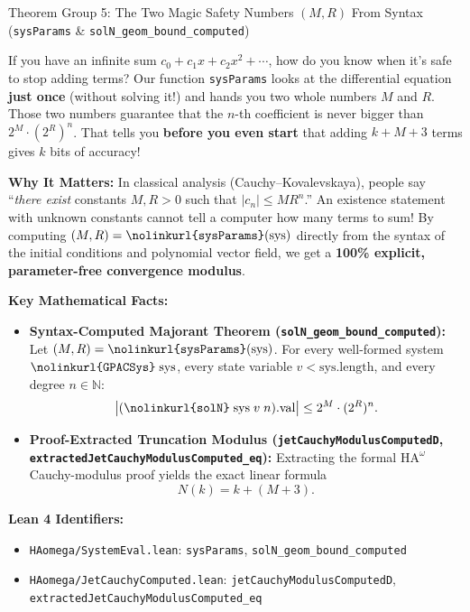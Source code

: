 \documentclass[11pt,a4paper]{article}
\newcommand{\HAomega}{\ensuremath{\mathrm{HA}^{\omega}}}
\newcommand{\N}{\ensuremath{\mathbb{N}}}
\newcommand{\lean}[1]{\texttt{\nolinkurl{#1}}}
\begin{document}
\vspace{6pt}

\begin{thmcard}{Theorem Group 5: The Two Magic Safety Numbers \texorpdfstring{$(M, R)$}{(M, R)} From Syntax (\lean{sysParams} \& \lean{solN\_geom\_bound\_computed})}
\begin{eli5box}
If you have an infinite sum $c_0 + c_1 x + c_2 x^2 + \cdots$, how do you know when it's safe to stop adding terms? Our function \lean{sysParams} looks at the differential equation \textbf{just once} (without solving it!) and hands you two whole numbers $M$ and $R$. Those two numbers guarantee that the $n$-th coefficient is never bigger than $2^M \cdot (2^R)^n$. That tells you \textbf{before you even start} that adding $k + M + 3$ terms gives $k$ bits of accuracy!
\end{eli5box}

\textbf{Why It Matters:}
In classical analysis (Cauchy--Kovalevskaya), people say ``\emph{there exist} constants $M, R > 0$ such that $|c_n| \le M R^n$.'' An existence statement with unknown constants cannot tell a computer how many terms to sum! By computing $(M, R) = \lean{sysParams}(\mathrm{sys})$ directly from the syntax of the initial conditions and polynomial vector field, we get a \textbf{100\% explicit, parameter-free convergence modulus}.

\textbf{Key Mathematical Facts:}
\begin{itemize}
  \item \textbf{Syntax-Computed Majorant Theorem (\lean{solN_geom_bound_computed}):} Let $(M, R) = \lean{sysParams}(\mathrm{sys})$. For every well-formed system $\lean{GPACSys}\;\mathrm{sys}$, every state variable $v < \mathrm{sys.length}$, and every degree $n \in \N$:
  \[
    \bigl|(\lean{solN}\;\mathrm{sys}\;v\;n).\mathrm{val}\bigr| \le 2^M \cdot (2^R)^n.
  \]
  \item \textbf{Proof-Extracted Truncation Modulus (\lean{jetCauchyModulusComputedD}, \lean{extractedJetCauchyModulusComputed_eq}):} Extracting the formal $\HAomega$ Cauchy-modulus proof yields the exact linear formula
  \[
    N(k) = k + (M + 3).
  \]
\end{itemize}

\textbf{Lean 4 Identifiers:}
\begin{itemize}
  \item \lean{HAomega/SystemEval.lean}: \lean{sysParams}, \lean{solN_geom_bound_computed}
  \item \lean{HAomega/JetCauchyComputed.lean}: \lean{jetCauchyModulusComputedD}, \lean{extractedJetCauchyModulusComputed_eq}
\end{itemize}
\end{thmcard}
\end{document}
